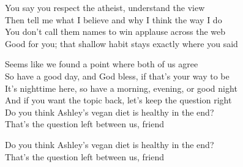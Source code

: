\begin{lyrics}
You say you respect the atheist, understand the view\\
Then tell me what I believe and why I think the way I do\\
You don't call them names to win applause across the web\\
Good for you; that shallow habit stays exactly where you said

Seems like we found a point where both of us agree\\
So have a good day, and God bless, if that's your way to be\\
It's nighttime here, so have a morning, evening, or good night\\
And if you want the topic back, let's keep the question right\\
Do you think Ashley's vegan diet is healthy in the end?\\
That's the question left between us, friend

Do you think Ashley's vegan diet is healthy in the end?\\
That's the question left between us, friend
\end{lyrics}


